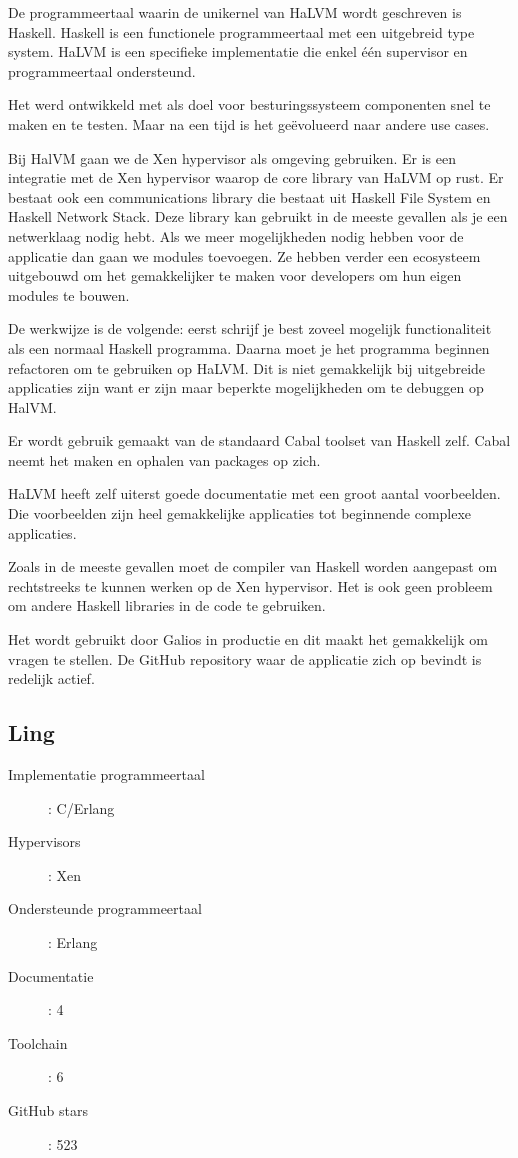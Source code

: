 \documentclass[pdftex,a4paper,12pt,twoside]{report}
\begin{document}
De programmeertaal waarin de unikernel van HaLVM wordt geschreven is Haskell. Haskell is een functionele programmeertaal met een uitgebreid type system. HaLVM is een specifieke implementatie die enkel één supervisor en programmeertaal ondersteund. 

Het werd ontwikkeld met als doel voor besturingssysteem componenten snel te maken en te testen. Maar na een tijd is het geëvolueerd naar andere use cases.

Bij HalVM gaan we de Xen hypervisor als omgeving gebruiken. Er is een integratie met de Xen hypervisor waarop de core library van HaLVM op rust. Er bestaat ook een communications library die bestaat uit Haskell File System en Haskell Network Stack. Deze library kan gebruikt in de meeste gevallen als je een netwerklaag nodig hebt. Als we meer mogelijkheden nodig hebben voor de applicatie dan gaan we modules toevoegen. Ze hebben verder een ecosysteem uitgebouwd om het gemakkelijker te maken voor developers om hun eigen modules te bouwen.

De werkwijze is de volgende: eerst schrijf je best zoveel mogelijk functionaliteit als een normaal Haskell programma. Daarna moet je het programma beginnen refactoren om te gebruiken op HaLVM.
Dit is niet gemakkelijk bij uitgebreide applicaties zijn want er zijn maar beperkte mogelijkheden om te debuggen op HalVM.

Er wordt gebruik gemaakt van de standaard Cabal toolset van Haskell zelf. Cabal neemt het maken en ophalen van packages op zich.

HaLVM heeft zelf uiterst goede documentatie met een groot aantal voorbeelden. Die voorbeelden zijn heel gemakkelijke applicaties tot beginnende complexe applicaties.

Zoals in de meeste gevallen moet de compiler van Haskell worden aangepast om rechtstreeks te kunnen werken op de Xen hypervisor. Het is ook geen probleem om andere Haskell libraries in de code te gebruiken.

Het wordt gebruikt door Galios in productie en dit maakt het gemakkelijk om vragen te stellen. De GitHub repository waar de applicatie zich op bevindt is redelijk actief.

\subsection{Ling}

\begin{description}
  \item [Implementatie programmeertaal]: C/Erlang
  \item [Hypervisors]: Xen
  \item [Ondersteunde programmeertaal]: Erlang
  \item [Documentatie]: 4
  \item [Toolchain]: 6
  \item [GitHub stars]: 523
\end{description}
\end{document}
